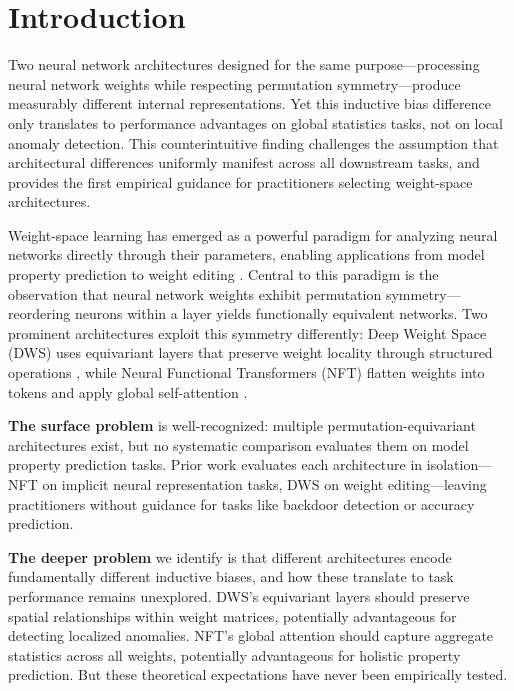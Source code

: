 \section{Introduction}

Two neural network architectures designed for the same purpose---processing neural network weights while respecting permutation symmetry---produce measurably different internal representations. Yet this inductive bias difference only translates to performance advantages on global statistics tasks, not on local anomaly detection. This counterintuitive finding challenges the assumption that architectural differences uniformly manifest across all downstream tasks, and provides the first empirical guidance for practitioners selecting weight-space architectures.

Weight-space learning has emerged as a powerful paradigm for analyzing neural networks directly through their parameters, enabling applications from model property prediction to weight editing \cite{zhou2024nft, navon2023dws}. Central to this paradigm is the observation that neural network weights exhibit permutation symmetry---reordering neurons within a layer yields functionally equivalent networks. Two prominent architectures exploit this symmetry differently: Deep Weight Space (DWS) uses equivariant layers that preserve weight locality through structured operations \cite{navon2023dws}, while Neural Functional Transformers (NFT) flatten weights into tokens and apply global self-attention \cite{zhou2024nft}.

\textbf{The surface problem} is well-recognized: multiple permutation-equivariant architectures exist, but no systematic comparison evaluates them on model property prediction tasks. Prior work evaluates each architecture in isolation---NFT on implicit neural representation tasks, DWS on weight editing---leaving practitioners without guidance for tasks like backdoor detection or accuracy prediction.

\textbf{The deeper problem} we identify is that different architectures encode fundamentally different inductive biases, and how these translate to task performance remains unexplored. DWS's equivariant layers should preserve spatial relationships within weight matrices, potentially advantageous for detecting localized anomalies. NFT's global attention should capture aggregate statistics across all weights, potentially advantageous for holistic property prediction. But these theoretical expectations have never been empirically tested.


